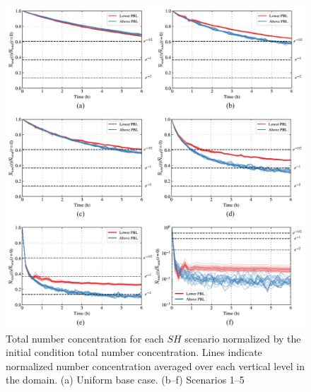 \begin{figure}[!h]
  \centering
    \includegraphics[width=\textwidth]{figures/chapter5/ideal-coag/NumConcTimescale_composite.pdf}
    \caption{Total number concentration for each $SH$ scenario normalized by the initial condition total number concentration. Lines indicate normalized number concentration averaged over each vertical level in the domain. (a) Uniform base case. (b--f) Scenarios 1--5}
    \label{fig:numconc-timescales}
\end{figure}

